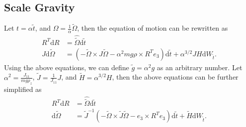\documentclass[10pt]{article}
\newcommand{\diff}[1]{\mathrm{d}#1}
\begin{document}
\subsection{Scale Gravity}

Let $t = \alpha\tilde{t}$, and $\Omega = \tfrac{1}{\alpha}\tilde{\Omega}$, then the equation of motion can be rewritten as
\begin{align*}
	R^T\diff{R} &= \hat{\tilde{\Omega}} \diff{\tilde{t}} \\
	J\diff{\tilde{\Omega}} &= (-\tilde{\Omega}\times J\tilde{\Omega} - \alpha^2mg\rho\times R^Te_3) \diff{\tilde{t}} + \alpha^{3/2} JH \diff{W_{\tilde{t}}}.
\end{align*}
Using the above equations, we can define $\tilde{g} = \alpha^2 g$ as an arbitrary number.
Let $\alpha^2 = \frac{J_{11}}{mg\rho_z}$, $\tilde{J} = \frac{1}{J_{11}}J$, and $\tilde{H} = \alpha^{3/2}H$, then the above equations can be further simplified as
\begin{align*}
	R^T\diff{R} &= \hat{\tilde{\Omega}} \diff{\tilde{t}} \\
	\diff{\tilde{\Omega}} &= \tilde{J}^{-1} (-\tilde{\Omega}\times \tilde{J}\tilde{\Omega} - e_3\times R^Te_3) \diff{\tilde{t}} + \tilde{H}\diff{W_{\tilde{t}}}.
\end{align*}
\end{document}
